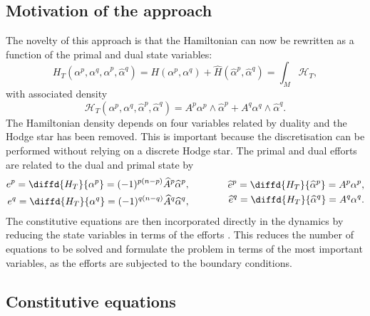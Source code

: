 \documentclass{elsarticle}
\newcommand*{\dual}[1]{\ensuremath{\widehat{#1}}}
\begin{document}
\subsection{Motivation of the approach}

The novelty of this approach is that the Hamiltonian can now be rewritten as a function of the primal and dual state variables:
 \begin{equation}
H_T(\alpha^p, \alpha^q, \dual{\alpha}^p, \dual{\alpha}^q) = H(\alpha^p, \alpha^q) + \dual{H}(\dual{\alpha}^p, \dual{\alpha}^q)= \int_M \mathcal{H}_T,
\end{equation}
with associated density
\begin{equation*}
\mathcal{H}_T
(\alpha^p, \alpha^q 
,\dual{\alpha}^p, \dual{\alpha}^q) 
= A^p \alpha^p \wedge \dual{\alpha}^p 
+ A^q \alpha^q \wedge \dual{\alpha}^q.    
\end{equation*}
The Hamiltonian density depends on four variables related by duality and the Hodge star has been removed. This is important because the discretisation can be performed without relying on a discrete Hodge star. The primal and dual efforts are related to the dual and primal state by
\begin{equation}
\begin{aligned}
    e^p = \diffd{H_T}{\alpha^p} = (-1)^{p(n-p)} \dual{A}^p \dual{\alpha}^p, \\
    e^q = \diffd{H_T}{\alpha^q} = (-1)^{q(n-q)} \dual{A}^q \dual{\alpha}^q, \\
\end{aligned} \qquad \qquad
\begin{aligned}
    \dual{e}^p = \diffd{H_T}{\dual{\alpha}^p} = A^p \alpha^p, \\
    \dual{e}^q = \diffd{H_T}{\dual{\alpha}^q} = A^q \alpha^q. \\
\end{aligned}
\end{equation}
The constitutive equations are then incorporated directly in the dynamics by reducing the state variables in terms of the efforts \cite{brugnoli2020}. This reduces the number of equations to be solved and formulate the problem in terms of the most important variables, as the efforts are subjected to the boundary conditions.


\subsection{Constitutive equations}
\end{document}

